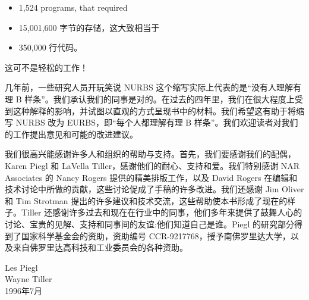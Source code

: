 \documentclass[main.tex]{subfiles}
\begin{document}
\HRule

\begin{itemize}
\item 1,524 programs, that required
\end{itemize}

\HRule

\begin{itemize}
\item 15,001,600 字节的存储，这大致相当于
\end{itemize}

\begin{itemize}
\item 350,000 行代码。
\end{itemize}

这可不是轻松的工作！

几年前，一些研究人员开玩笑说 NURBS 这个缩写实际上代表的是“没有人理解有理 B 样条”。我们承认我们的同事是对的。在过去的四年里，我们在很大程度上受到这种解释的影响，并试图以直观的方式呈现书中的材料。我们希望这有助于将缩写 NURBS 改为 EURBS，即“每个人都理解有理 B 样条”。我们欢迎读者对我们的工作提出意见和可能的改进建议。

我们很高兴能感谢许多人和组织的帮助与支持。首先，我们要感谢我们的配偶，Karen Piegl 和 LaVella Tiller，感谢他们的耐心、支持和爱。我们特别感谢 NAR Associates 的 Nancy Rogers 提供的精美排版工作，以及 David Rogers 在编辑和技术讨论中所做的贡献，这些讨论促成了手稿的许多改进。我们还感谢 Jim Oliver 和 Tim Strotman 提出的许多建议和技术交流，这些帮助使本书形成了现在的样子。Tiller 还感谢许多过去和现在在行业中的同事，他们多年来提供了鼓舞人心的讨论、宝贵的见解、支持和同事间的友谊:他们知道自己是谁。Piegl 的研究部分得到了国家科学基金会的资助，资助编号 CCR-9217768，授予南佛罗里达大学，以及来自佛罗里达高科技和工业委员会的各种资助。

\begin{flushright}
Les Piegl\\
Wayne Tiller \\
1996年7月
\end{flushright}
\end{document}
